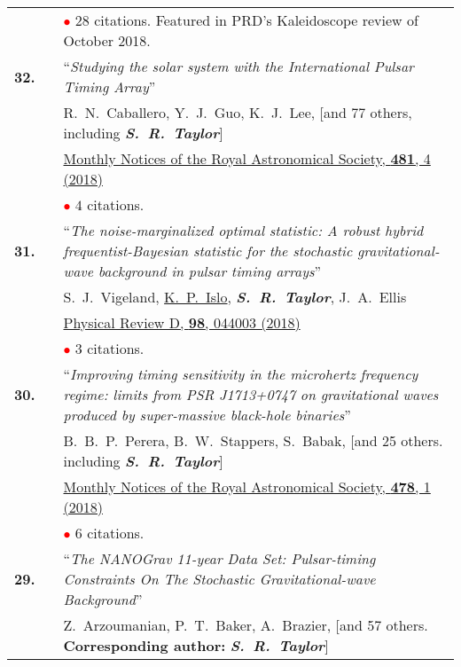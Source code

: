 \documentclass[11pt,letterpaper,sans]{moderncv}
\begin{document}
{\begin{longtable}{rp{0.3cm}p{15.8cm}}
&& \textcolor{red}{$\bullet$} $28$ citations. Featured in PRD's Kaleidoscope review of October 2018. \vspace{0.09cm}\\
\textbf{32.} & & ``\textit{Studying the solar system with the International Pulsar Timing Array}'' \\ 
&&R.~N.~Caballero, Y.~J.~Guo, K.~J.~Lee, [and 77 others, including  \textit{\textbf{S.~R.~Taylor}}]\\
&& \href{https://academic.oup.com/mnras/article-abstract/481/4/5501/5113478?redirectedFrom=fulltext}{{\color{color1} Monthly Notices of the Royal Astronomical Society, \textbf{481}, 4 (2018)}}  \\
&& \textcolor{red}{$\bullet$} $4$ citations. \vspace{0.09cm}\\
\textbf{31.} & & ``\textit{The noise-marginalized optimal statistic: A robust hybrid frequentist-Bayesian statistic for the stochastic gravitational-wave background in pulsar timing arrays}'' \\ 
&&S.~J.~Vigeland, \underline{K.~P.~Islo}, \textit{\textbf{S.~R.~Taylor}}, J.~A.~Ellis \\
&& \href{https://journals.aps.org/prd/abstract/10.1103/PhysRevD.98.044003}{{\color{color1} Physical Review D, \textbf{98}, 044003 (2018)}}  \\
&& \textcolor{red}{$\bullet$} $3$ citations. \vspace{0.09cm}\\
\textbf{30.} & & ``\textit{Improving timing sensitivity in the microhertz frequency regime: limits from PSR J1713+0747 on gravitational waves produced by super-massive black-hole binaries}'' \\ 
&&B.~B.~P.~Perera, B.~W.~Stappers, S.~Babak, [and 25 others. including \textit{\textbf{S.~R.~Taylor}}]\\
&& \href{https://academic.oup.com/mnras/article-abstract/478/1/218/4990951?redirectedFrom=fulltext}{{\color{color1} Monthly Notices of the Royal Astronomical Society, \textbf{478}, 1 (2018)}}  \\
&& \textcolor{red}{$\bullet$} $6$ citations. \vspace{0.09cm}\\
\textbf{29.} & & ``\textit{The NANOGrav 11-year Data Set: Pulsar-timing Constraints On The Stochastic Gravitational-wave Background}'' \\ 
&&Z.~Arzoumanian, P.~T.~Baker, A.~Brazier, [and 57 others. \textbf{Corresponding author:} \textit{\textbf{S.~R.~Taylor}}]\\

\end{longtable}}
\end{document}
